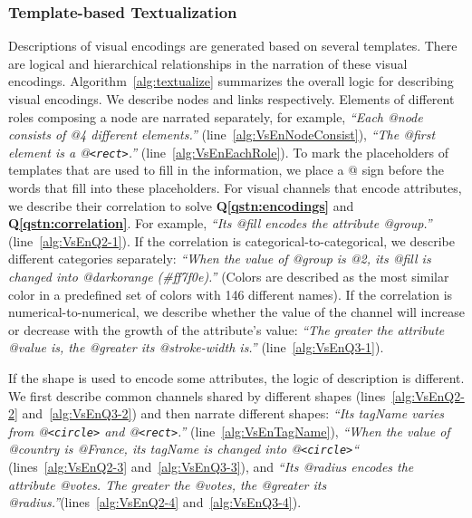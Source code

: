 \subsubsection {Template-based Textualization}
Descriptions of visual encodings are generated based on several templates.
There are logical and hierarchical relationships in the narration of these visual encodings.
Algorithm~\ref{alg:textualize} summarizes the overall logic for describing visual encodings.
We describe nodes and links respectively.
Elements of different roles composing a node are narrated separately, for example,
\textit{``Each @node consists of @4 different elements.''} (line~\ref{alg:VsEnNodeConsist}),
\textit{``The @first element is a @\texttt{<rect>}.''} (line~\ref{alg:VsEnEachRole}).
To mark the placeholders of templates that are used to fill in the information, we place a @ sign before the words that fill into these placeholders.
For visual channels that encode attributes, we describe their correlation to solve \textbf{Q\ref{qstn:encodings}} and \textbf{Q\ref{qstn:correlation}}.
For example, \textit{``Its @fill encodes the attribute @group.''} (line~\ref{alg:VsEnQ2-1}).
If the correlation is categorical-to-categorical, we describe different categories separately: \textit{``When the value of @group is @2, its @fill is changed into @darkorange (\#ff7f0e).''} (Colors are described as the most similar color in a predefined set of colors with 146 different names).
If the correlation is numerical-to-numerical, we describe whether the value of the channel will increase or decrease with the growth of the attribute's value: \textit{``The greater the attribute @value is, the @greater its @stroke-width is.''} (line~\ref{alg:VsEnQ3-1}).

If the shape is used to encode some attributes, the logic of description is different.
We first describe common channels shared by different shapes (lines~\ref{alg:VsEnQ2-2} and~\ref{alg:VsEnQ3-2}) and then narrate different shapes:
\textit{``Its tagName varies from @\texttt{<circle>} and @\texttt{<rect>}.''} (line~\ref{alg:VsEnTagName}), \textit{``When the value of @country is @France, its tagName is changed into @\texttt{<circle>}``} (lines~\ref{alg:VsEnQ2-3} and~\ref{alg:VsEnQ3-3}), and \textit{``Its @radius encodes the attribute @votes. The greater the @votes, the @greater its @radius.''}(lines~\ref{alg:VsEnQ2-4} and~\ref{alg:VsEnQ3-4}).

